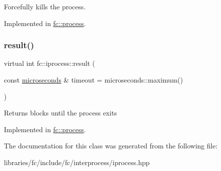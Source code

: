 Forcefully kills the process. 

Implemented in \mbox{\hyperlink{classfc_1_1process_a159c67b1fcff5dffb6678d15090ab335}{fc\+::process}}.

\mbox{\label{classfc_1_1iprocess_abe1c8fb231fe682868561a1193361ce9}} 
\subsubsection{\texorpdfstring{result()}{result()}}
{\footnotesize\ttfamily virtual int fc\+::iprocess\+::result (\begin{DoxyParamCaption}\item[{const \mbox{\hyperlink{classfc_1_1microseconds}{microseconds}} \&}]{timeout = {\ttfamily microseconds\+:\+:maximum()} }\end{DoxyParamCaption})\hspace{0.3cm}{\ttfamily [pure virtual]}}

\begin{DoxyReturn}{Returns}
blocks until the process exits 
\end{DoxyReturn}


Implemented in \mbox{\hyperlink{classfc_1_1process_a58711b1b058e41f8139a971d3cc9b0a4}{fc\+::process}}.



The documentation for this class was generated from the following file\+:\begin{DoxyCompactItemize}
\item 
libraries/fc/include/fc/interprocess/iprocess.\+hpp\end{DoxyCompactItemize}
